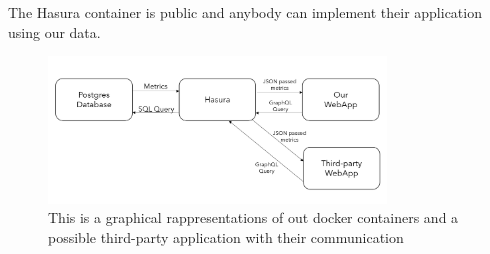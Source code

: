 The Hasura container is public and anybody can implement their application using our data.

\begin{figure}[H]
    \centering
    \includegraphics[width=0.80\textwidth]{./img/docker.png}
    \caption{This is a graphical rappresentations of out docker containers and a possible third-party application with their communication}
    \label{fig:docker}
\end{figure}
